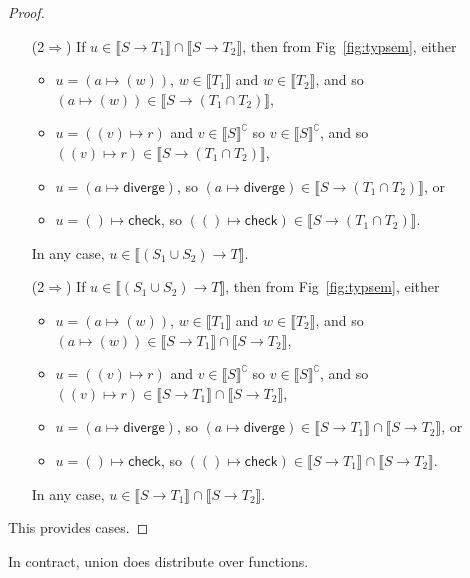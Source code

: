 \documentclass[acmsmall,review,screen]{acmart}
\newcommand{\DIVERGE}{\mathsf{diverge}}
\newcommand{\CHECK}{\mathsf{check}}
\newcommand{\fun}{\mathbin{\rightarrow}}
\newcommand{\sem}[1]{\llbracket{#1}\rrbracket}
\newcommand{\nsem}[1]{\llbracket{#1}\rrbracket^\complement}
\begin{document}
\begin{proof}
\begin{enumerate}
    \item[(2$\Rightarrow$)]
  If $u \in \sem{S \fun T_1} \cap \sem{S \fun T_2}$,
  then from Fig~\ref{fig:typsem}, either
  \begin{itemize}
  \item $u = (a \mapsto (w))$, $w \in \sem{T_1}$ and $w \in \sem{T_2}$, 
    and so $(a \mapsto (w)) \in \sem{S \fun (T_1 \cap T_2)}$,
  \item $u = ((v) \mapsto r)$ and $v \in \nsem{S}$
    so $v \in \nsem{S}$,
    and so $((v) \mapsto r) \in \sem{S \fun (T_1 \cap T_2)}$,
  \item $u = (a \mapsto \DIVERGE)$, so $(a \mapsto \DIVERGE) \in \sem{S \fun (T_1 \cap T_2)}$, or
  \item $u = () \mapsto \CHECK$, so $(() \mapsto \CHECK) \in \sem{S \fun (T_1 \cap T_2)}$.
  \end{itemize}
  In any case, $u \in \sem{(S_1 \cup S_2) \fun T}$.

    \item[(2$\Rightarrow$)]
  If $u \in \sem{(S_1 \cup S_2) \fun T}$,
  then from Fig~\ref{fig:typsem}, either
  \begin{itemize}
  \item $u = (a \mapsto (w))$, $w \in \sem{T_1}$ and $w \in \sem{T_2}$, 
    and so $(a \mapsto (w)) \in \sem{S \fun T_1} \cap \sem{S \fun T_2}$,
  \item $u = ((v) \mapsto r)$ and $v \in \nsem{S}$
    so $v \in \nsem{S}$,
    and so $((v) \mapsto r) \in \sem{S \fun T_1} \cap \sem{S \fun T_2}$,
  \item $u = (a \mapsto \DIVERGE)$, so $(a \mapsto \DIVERGE) \in \sem{S \fun T_1} \cap \sem{S \fun T_2}$, or
  \item $u = () \mapsto \CHECK$, so $(() \mapsto \CHECK) \in \sem{S \fun T_1} \cap \sem{S \fun T_2}$.
  \end{itemize}
  In any case, $u \in \sem{S \fun T_1} \cap \sem{S \fun T_2}$.
  
  \end{enumerate}
  This provides cases.
\end{proof}

In contract, union does distribute over functions.
\end{document}
